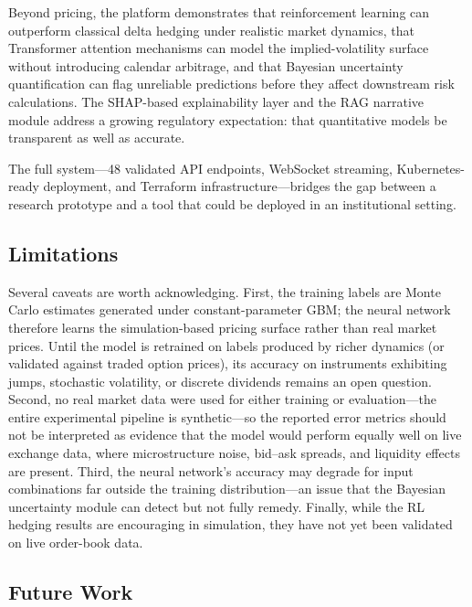 \documentclass[conference]{IEEEtran}
\begin{document}
Beyond pricing, the platform demonstrates that reinforcement learning can outperform classical delta hedging under realistic market dynamics, that Transformer attention mechanisms can model the implied-volatility surface without introducing calendar arbitrage, and that Bayesian uncertainty quantification can flag unreliable predictions before they affect downstream risk calculations. The SHAP-based explainability layer and the RAG narrative module address a growing regulatory expectation: that quantitative models be transparent as well as accurate.

The full system---48 validated API endpoints, WebSocket streaming, Kubernetes-ready deployment, and Terraform infrastructure---bridges the gap between a research prototype and a tool that could be deployed in an institutional setting.

\subsection{Limitations}

Several caveats are worth acknowledging. First, the training labels are Monte Carlo estimates generated under constant-parameter GBM; the neural network therefore learns the simulation-based pricing surface rather than real market prices. Until the model is retrained on labels produced by richer dynamics (or validated against traded option prices), its accuracy on instruments exhibiting jumps, stochastic volatility, or discrete dividends remains an open question. Second, no real market data were used for either training or evaluation---the entire experimental pipeline is synthetic---so the reported error metrics should not be interpreted as evidence that the model would perform equally well on live exchange data, where microstructure noise, bid--ask spreads, and liquidity effects are present. Third, the neural network's accuracy may degrade for input combinations far outside the training distribution---an issue that the Bayesian uncertainty module can detect but not fully remedy. Finally, while the RL hedging results are encouraging in simulation, they have not yet been validated on live order-book data.

\subsection{Future Work}
\end{document}
